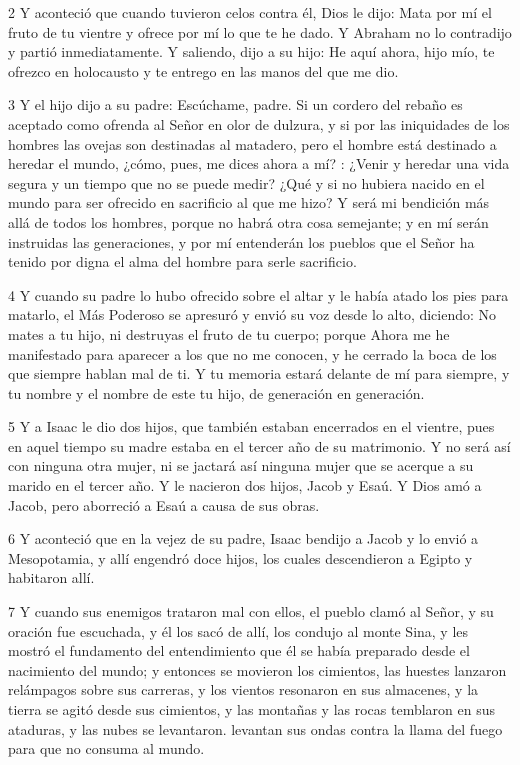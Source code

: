 \par 2 Y aconteció que cuando tuvieron celos contra él, Dios le dijo: Mata por mí el fruto de tu vientre y ofrece por mí lo que te he dado. Y Abraham no lo contradijo y partió inmediatamente. Y saliendo, dijo a su hijo: He aquí ahora, hijo mío, te ofrezco en holocausto y te entrego en las manos del que me dio.

\par 3 Y el hijo dijo a su padre: Escúchame, padre. Si un cordero del rebaño es aceptado como ofrenda al Señor en olor de dulzura, y si por las iniquidades de los hombres las ovejas son destinadas al matadero, pero el hombre está destinado a heredar el mundo, ¿cómo, pues, me dices ahora a mí? : ¿Venir y heredar una vida segura y un tiempo que no se puede medir? ¿Qué y si no hubiera nacido en el mundo para ser ofrecido en sacrificio al que me hizo? Y será mi bendición más allá de todos los hombres, porque no habrá otra cosa semejante; y en mí serán instruidas las generaciones, y por mí entenderán los pueblos que el Señor ha tenido por digna el alma del hombre para serle sacrificio.

\par 4 Y cuando su padre lo hubo ofrecido sobre el altar y le había atado los pies para matarlo, el Más Poderoso se apresuró y envió su voz desde lo alto, diciendo: No mates a tu hijo, ni destruyas el fruto de tu cuerpo; porque Ahora me he manifestado para aparecer a los que no me conocen, y he cerrado la boca de los que siempre hablan mal de ti. Y tu memoria estará delante de mí para siempre, y tu nombre y el nombre de este tu hijo, de generación en generación.

\par 5 Y a Isaac le dio dos hijos, que también estaban encerrados en el vientre, pues en aquel tiempo su madre estaba en el tercer año de su matrimonio. Y no será así con ninguna otra mujer, ni se jactará así ninguna mujer que se acerque a su marido en el tercer año. Y le nacieron dos hijos, Jacob y Esaú. Y Dios amó a Jacob, pero aborreció a Esaú a causa de sus obras.

\par 6 Y aconteció que en la vejez de su padre, Isaac bendijo a Jacob y lo envió a Mesopotamia, y allí engendró doce hijos, los cuales descendieron a Egipto y habitaron allí.

\par 7 Y cuando sus enemigos trataron mal con ellos, el pueblo clamó al Señor, y su oración fue escuchada, y él los sacó de allí, los condujo al monte Sina, y les mostró el fundamento del entendimiento que él se había preparado desde el nacimiento del mundo; y entonces se movieron los cimientos, las huestes lanzaron relámpagos sobre sus carreras, y los vientos resonaron en sus almacenes, y la tierra se agitó desde sus cimientos, y las montañas y las rocas temblaron en sus ataduras, y las nubes se levantaron. levantan sus ondas contra la llama del fuego para que no consuma al mundo.

